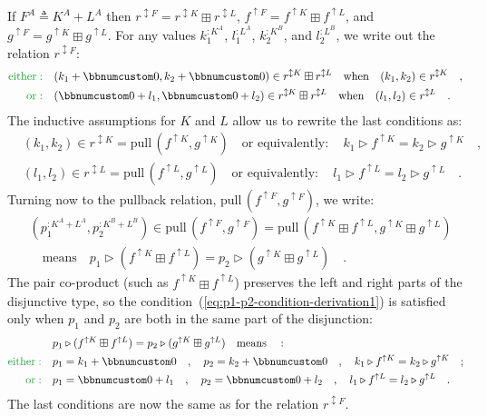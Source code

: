 If $F^{A}\triangleq K^{A}+L^{A}$ then $r^{\updownarrow F}=r^{\updownarrow K}\boxplus r^{\updownarrow L}$,
$f^{\uparrow F}=f^{\uparrow K}\boxplus f^{\uparrow L}$, and $g^{\uparrow F}=g^{\uparrow K}\boxplus g^{\uparrow L}$.
For any values $k_{1}^{:K^{A}}$, $l_{1}^{:L^{A}}$, $k_{2}^{:K^{B}}$,
and $l_{2}^{:L^{B}}$, we write out the relation $r^{\updownarrow F}$:
\begin{align*}
{\color{greenunder}\text{either}:}\quad & (k_{1}+\bbnum 0,k_{2}+\bbnum 0)\in r^{\updownarrow K}\boxplus r^{\updownarrow L}\quad\text{when}\quad(k_{1},k_{2})\in r^{\updownarrow K}\quad,\\
{\color{greenunder}\text{or}:}\quad & (\bbnum 0+l_{1},\bbnum 0+l_{2})\in r^{\updownarrow K}\boxplus r^{\updownarrow L}\quad\text{when}\quad(l_{1},l_{2})\in r^{\updownarrow L}\quad.
\end{align*}
The inductive assumptions for $K$ and $L$ allow us to rewrite the
last conditions as:
\begin{align*}
 & (k_{1},k_{2})\in r^{\updownarrow K}=\text{pull}\,(f^{\uparrow K},g^{\uparrow K})\quad\text{or equivalently}:\quad k_{1}\triangleright f^{\uparrow K}=k_{2}\triangleright g^{\uparrow K}\quad,\\
 & (l_{1},l_{2})\in r^{\updownarrow L}=\text{pull}\,(f^{\uparrow L},g^{\uparrow L})\quad\text{or equivalently}:\quad l_{1}\triangleright f^{\uparrow L}=l_{2}\triangleright g^{\uparrow L}\quad.
\end{align*}
Turning now to the pullback relation, $\text{pull}\,(f^{\uparrow F},g^{\uparrow F})$,
we write:
\begin{align}
 & (p_{1}^{:K^{A}+L^{A}},p_{2}^{:K^{B}+L^{B}})\in\text{pull}\,(f^{\uparrow F},g^{\uparrow F})=\text{pull}\,(f^{\uparrow K}\boxplus f^{\uparrow L},g^{\uparrow K}\boxplus g^{\uparrow L})\nonumber \\
 & \quad\text{means}\quad p_{1}\triangleright(f^{\uparrow K}\boxplus f^{\uparrow L})=p_{2}\triangleright(g^{\uparrow K}\boxplus g^{\uparrow L})\quad.\label{eq:p1-p2-condition-derivation1}
\end{align}
The pair co-product (such as $f^{\uparrow K}\boxplus f^{\uparrow L}$)
preserves the left and right parts of the disjunctive type, so the
condition~(\ref{eq:p1-p2-condition-derivation1}) is satisfied only
when $p_{1}$ and $p_{2}$ are both in the same part of the disjunction:
\begin{align*}
 & p_{1}\triangleright(f^{\uparrow K}\boxplus f^{\uparrow L})=p_{2}\triangleright(g^{\uparrow K}\boxplus g^{\uparrow L})\quad\text{means}\quad:\\
{\color{greenunder}\text{either}:}\quad & p_{1}=k_{1}+\bbnum 0\quad,\quad p_{2}=k_{2}+\bbnum 0\quad,\quad k_{1}\triangleright f^{\uparrow K}=k_{2}\triangleright g^{\uparrow K}\quad;\\
{\color{greenunder}\text{or}:}\quad & p_{1}=\bbnum 0+l_{1}\quad,\quad p_{2}=\bbnum 0+l_{2}\quad,\quad l_{1}\triangleright f^{\uparrow L}=l_{2}\triangleright g^{\uparrow L}\quad.
\end{align*}
The last conditions are now the same as for the relation $r^{\updownarrow F}$.

